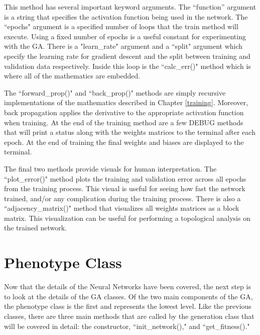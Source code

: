 \documentclass[12pt]{report}
\begin{document}
This method has several important keyword arguments. The ``function'' argument is a string that specifies the activation function being used in the network. The ``epochs" argument is a specified number of loops that the train method will execute. Using a fixed number of epochs is a useful constant for experimenting with the GA. There is a "learn\_rate" argument and a ``split" argument which specify the learning rate for gradient descent and the split between training and validation data respectively. Inside this loop is the ``calc\_err()" method which is where all of the mathematics are embedded.



The ``forward\_prop()" and ``back\_prop()" methods are simply recursive implementations of the mathematics described in Chapter \ref{training}.
Moreover, back propagation applies the derivative to the appropriate activation function when training.
At the end of the training method are a few DEBUG methods that will print a status along with the weights matrices to the terminal after each epoch.
At the end of training the final weights and biases are displayed to the terminal.

The final two methods provide visuals for human interpretation.
The ``plot\_error()" method plots the training and validation error across all epochs from the training process.
This visual is useful for seeing how fast the network trained, and/or any complication during the training process.
There is also a ``adjacency\_matrix()" method that visualizes all weights matrices as a block matrix.
This visualization can be useful for performing a topological analysis on the trained network.

\section{Phenotype Class}
Now that the details of the Neural Networks have been covered, the next step is to look at the details of the GA classes.
Of the two main components of the GA, the phenotype class is the first and represents the lowest level.
Like the previous classes, there are three main methods that are called by the generation class that will be covered in detail: the constructor, ``init\_network()," and ``get\_fitness()."


\end{document}

